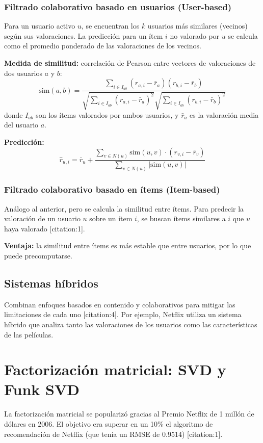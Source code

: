 \documentclass[12pt,a4paper,openany,oneside]{book}
\begin{document}
\subsubsection{Filtrado colaborativo basado en usuarios (User-based)}
Para un usuario activo \(u\), se encuentran los \(k\) usuarios más similares (vecinos) según sus valoraciones. La predicción para un ítem \(i\) no valorado por \(u\) se calcula como el promedio ponderado de las valoraciones de los vecinos.

\textbf{Medida de similitud:} correlación de Pearson entre vectores de valoraciones de dos usuarios \(a\) y \(b\):
\[
\text{sim}(a,b) = \frac{\sum_{i \in I_{ab}} (r_{a,i} - \bar{r}_a)(r_{b,i} - \bar{r}_b)}{\sqrt{\sum_{i \in I_{ab}} (r_{a,i} - \bar{r}_a)^2} \sqrt{\sum_{i \in I_{ab}} (r_{b,i} - \bar{r}_b)^2}}
\]
donde \(I_{ab}\) son los ítems valorados por ambos usuarios, y \(\bar{r}_a\) es la valoración media del usuario \(a\).

\textbf{Predicción:}
\[
\hat{r}_{u,i} = \bar{r}_u + \frac{\sum_{v \in N(u)} \text{sim}(u,v) \cdot (r_{v,i} - \bar{r}_v)}{\sum_{v \in N(u)} |\text{sim}(u,v)|}
\]

\subsubsection{Filtrado colaborativo basado en ítems (Item-based)}
Análogo al anterior, pero se calcula la similitud entre ítems. Para predecir la valoración de un usuario \(u\) sobre un ítem \(i\), se buscan ítems similares a \(i\) que \(u\) haya valorado [citation:1].

\textbf{Ventaja:} la similitud entre ítems es más estable que entre usuarios, por lo que puede precomputarse.

\subsection{Sistemas híbridos}
Combinan enfoques basados en contenido y colaborativos para mitigar las limitaciones de cada uno [citation:4]. Por ejemplo, Netflix utiliza un sistema híbrido que analiza tanto las valoraciones de los usuarios como las características de las películas.

\section{Factorización matricial: SVD y Funk SVD}

La factorización matricial se popularizó gracias al Premio Netflix de 1 millón de dólares en 2006. El objetivo era superar en un 10\% el algoritmo de recomendación de Netflix (que tenía un RMSE de 0.9514) [citation:1].
\end{document}
